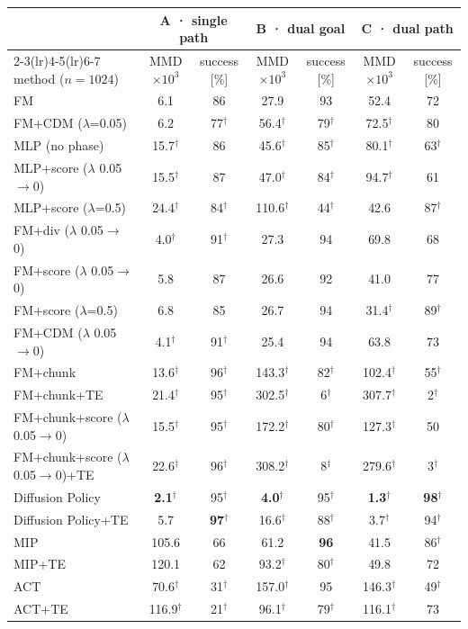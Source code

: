 \begin{tabular}{lcccccc}
\toprule
 & \multicolumn{2}{c}{A · single path} & \multicolumn{2}{c}{B · dual goal} & \multicolumn{2}{c}{C · dual path} \\
\cmidrule(lr){2-3}\cmidrule(lr){4-5}\cmidrule(lr){6-7}
method ($n = 1024$) & MMD$\times10^3$ & success [\%] & MMD$\times10^3$ & success [\%] & MMD$\times10^3$ & success [\%] \\
\midrule
FM & 6.1 & 86 & 27.9 & 93 & 52.4 & 72 \\
FM+CDM ($\lambda$=0.05) & 6.2 & 77$^\dagger$ & 56.4$^\dagger$ & 79$^\dagger$ & 72.5$^\dagger$ & 80 \\
MLP (no phase) & 15.7$^\dagger$ & 86 & 45.6$^\dagger$ & 85$^\dagger$ & 80.1$^\dagger$ & 63$^\dagger$ \\
MLP+score ($\lambda$ 0.05$\to$0) & 15.5$^\dagger$ & 87 & 47.0$^\dagger$ & 84$^\dagger$ & 94.7$^\dagger$ & 61 \\
MLP+score ($\lambda$=0.5) & 24.4$^\dagger$ & 84$^\dagger$ & 110.6$^\dagger$ & 44$^\dagger$ & 42.6 & 87$^\dagger$ \\
FM+div ($\lambda$ 0.05$\to$0) & 4.0$^\dagger$ & 91$^\dagger$ & 27.3 & 94 & 69.8 & 68 \\
FM+score ($\lambda$ 0.05$\to$0) & 5.8 & 87 & 26.6 & 92 & 41.0 & 77 \\
FM+score ($\lambda$=0.5) & 6.8 & 85 & 26.7 & 94 & 31.4$^\dagger$ & 89$^\dagger$ \\
FM+CDM ($\lambda$ 0.05$\to$0) & 4.1$^\dagger$ & 91$^\dagger$ & 25.4 & 94 & 63.8 & 73 \\
FM+chunk & 13.6$^\dagger$ & 96$^\dagger$ & 143.3$^\dagger$ & 82$^\dagger$ & 102.4$^\dagger$ & 55$^\dagger$ \\
FM+chunk+TE & 21.4$^\dagger$ & 95$^\dagger$ & 302.5$^\dagger$ & 6$^\dagger$ & 307.7$^\dagger$ & 2$^\dagger$ \\
FM+chunk+score ($\lambda$ 0.05$\to$0) & 15.5$^\dagger$ & 95$^\dagger$ & 172.2$^\dagger$ & 80$^\dagger$ & 127.3$^\dagger$ & 50 \\
FM+chunk+score ($\lambda$ 0.05$\to$0)+TE & 22.6$^\dagger$ & 96$^\dagger$ & 308.2$^\dagger$ & 8$^\dagger$ & 279.6$^\dagger$ & 3$^\dagger$ \\
\midrule
Diffusion Policy & \textbf{2.1}$^\dagger$ & 95$^\dagger$ & \textbf{4.0}$^\dagger$ & 95$^\dagger$ & \textbf{1.3}$^\dagger$ & \textbf{98}$^\dagger$ \\
Diffusion Policy+TE & 5.7 & \textbf{97}$^\dagger$ & 16.6$^\dagger$ & 88$^\dagger$ & 3.7$^\dagger$ & 94$^\dagger$ \\
MIP & 105.6 & 66 & 61.2 & \textbf{96} & 41.5 & 86$^\dagger$ \\
MIP+TE & 120.1 & 62 & 93.2$^\dagger$ & 80$^\dagger$ & 49.8 & 72 \\
ACT & 70.6$^\dagger$ & 31$^\dagger$ & 157.0$^\dagger$ & 95 & 146.3$^\dagger$ & 49$^\dagger$ \\
ACT+TE & 116.9$^\dagger$ & 21$^\dagger$ & 96.1$^\dagger$ & 79$^\dagger$ & 116.1$^\dagger$ & 73 \\
\bottomrule
\end{tabular}
